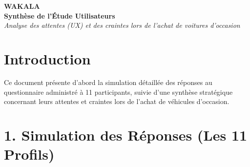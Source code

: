 \documentclass[a4paper, 11pt]{article}
\begin{document}
\begin{center}
    {\Huge \textcolor{primaryBlue}{\textbf{WAKALA}}}\\[0.5cm]
    {\LARGE \bfseries \textcolor{primaryBlue}{Synthèse de l'Étude Utilisateurs}}\\[0.2cm]
    {\large \textit{Analyse des attentes (UX) et des craintes lors de l'achat de voitures d'occasion}}
\end{center}

\vspace{0.8cm}

\section*{Introduction}
Ce document présente d'abord la simulation détaillée des réponses au questionnaire administré à 11 participants, suivie d'une synthèse stratégique concernant leurs attentes et craintes lors de l'achat de véhicules d'occasion.

\vspace{0.5cm}

\section*{1. Simulation des Réponses (Les 11 Profils)}
\end{document}
